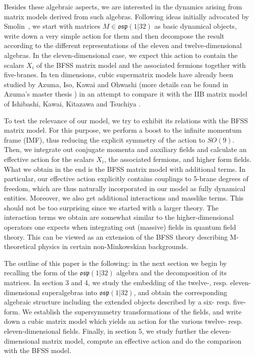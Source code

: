 \documentclass[a4paper,11pt]{article}
\begin{document}
Besides these algebraic aspects, we are interested in the dynamics arising from matrix models derived from
such algebras. Following ideas initially advocated by Smolin~\cite{Smo1}, we start with matrices 
$M\in \mathfrak{osp}(1|32)$ as basic dynamical objects, write down a very simple action for them and then 
decompose the result according to the different representations of the eleven and twelve-dimensional algebras. 
In the eleven-dimensional case, we expect this action to contain the scalars $X_i$ of  
the BFSS matrix model and the associated fermions together with five-branes. 
In ten dimensions, cubic supermatrix models have already been studied by Azuma, Iso,  Kawai and Ohwashi \cite{AIKO} 
(more details can be found in Azuma's master thesis \cite{Azu}) in an attempt to compare it with the IIB
matrix model of Ishibashi, Kawai, Kitazawa and Tsuchiya \cite{IKKT}.

To test the relevance of our model, we try to exhibit its relations with the BFSS matrix model. For this purpose,
we perform a boost to the infinite momentum frame (IMF), thus reducing the explicit symmetry of the action to $SO(9)$.
Then, we integrate out conjugate momenta and auxiliary fields and calculate an effective action for the scalars 
$X_i$, the associated fermions, and higher form fields. What we obtain in the end is the BFSS matrix model with additional 
terms. In particular, our effective action explicitly contains couplings to 5-brane degrees of freedom, which are 
thus naturally incorporated in our model as fully dynamical entities. Moreover, we also get additional interactions 
and masslike terms. This should not be too surprising since we started with a larger theory.
The interaction terms we obtain are somewhat similar to the higher-dimensional operators one expects when integrating out 
(massive) fields in quantum field theory. This can be viewed as an extension of the BFSS theory
describing M-theoretical physics in certain non-Minkowskian backgrounds.

The outline of this paper is the following: in the next section we begin by recalling the form of 
the $\mathfrak{osp}(1|32)$ algebra and the decomposition of its matrices. In section 3 and 4, we study 
the embedding of the twelve-, resp. eleven-dimensional superalgebras into $\mathfrak{osp}(1|32)$, 
and obtain the corresponding algebraic structure including the extended objects described by a six- resp. five-form. 
We establish the supersymmetry transformations of the fields, and write down a cubic matrix model which 
yields an action for the various twelve- resp. eleven-dimensional fields. 
Finally, in section 5, we study further the eleven-dimensional matrix model, compute an effective action and do 
the comparison with the BFSS model.
\end{document}
